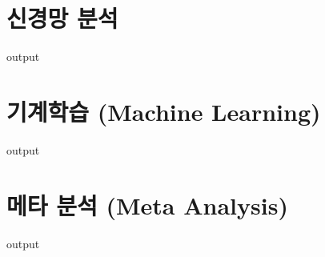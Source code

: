 \section{신경망 분석}
\begin{Schunk}
\begin{Soutput}
output
\end{Soutput}
\end{Schunk}

\section{기계학습 (Machine Learning)}
\begin{Schunk}
\begin{Soutput}
output
\end{Soutput}
\end{Schunk}

\section{메타 분석 (Meta Analysis)}
\begin{Schunk}
\begin{Soutput}
output
\end{Soutput}
\end{Schunk}


%
%
%

